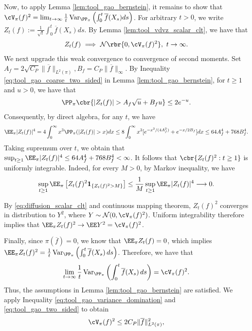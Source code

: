 \documentclass[11pt]{article}
\begin{document}
Now, to apply Lemma \ref{lem:tool_gao_bernstein}, it remains to show that $\cV_\pi(f)^2=\lim_{t\to\infty}
\frac1t
\operatorname{Var}_{\PP_\pi}
\left(
\int_0^t\overline f(X_s)ds
\right)$.
For arbitrary $t>0$, we write $Z_t(f)
:=
\frac1{\sqrt t}
\int_0^t\overline f(X_s)ds$. By Lemma \ref{lem:tool_vdvz_scalar_clt}, we have that
\begin{align}
Z_t(f)
\ \Longrightarrow\
\mathcal N\rbr{0,\cV_\pi(f)^2},
\ t\to\infty.
\label{eq:diffusion_scalar_clt}
\end{align}
We next upgrade this weak convergence to convergence of second moments.
Set
$A_f=
2\sqrt{C_P}\|\overline f\|_{L^2(\pi)},
B_f=
C_P\|\overline f\|_\infty$.
By Inequality \eqref{eq:tool_gao_coarse_two_sided} in Lemma \ref{lem:tool_gao_bernstein}, for $t\ge1$ and
$u>0$, we have that
\begin{align*}
\PP_\pi\cbr{
|Z_t(f)|>A_f\sqrt u+B_fu
}
\le2e^{-u}.
\end{align*}
Consequently, by direct algebra, for any $t$, we have
\begin{align*}
    \EE_\pi|Z_t(f)|^4=4\int_{0}^{\infty}x^3\PP_{\pi}(|Z_t(f)|>x)dx\le 8\int_{0}^{\infty}x^3[e^{-x^2/(4A_f^2)}+e^{-x/2B_f}]dx\le 64A_f^4+768B_f^4.
\end{align*}
Taking supremum over $t$, we obtain that
$\sup_{t\ge1}\EE_\pi|Z_t(f)|^4
\le
64A_f^4+768B_f^4
<\infty$. It follows that $\cbr{Z_t(f)^2:t\ge1}$ is uniformly integrable. Indeed,
for every $M>0$, by Markov inequality, we have
\begin{align*}
\sup_{t\ge1}
\EE_\pi\left[
Z_t(f)^2
\mathbf 1_{\{Z_t(f)^2>M\}}
\right]
\le
\frac1M
\sup_{t\ge1}\EE_\pi|Z_t(f)|^4
\longrightarrow0.
\end{align*}

By \eqref{eq:diffusion_scalar_clt} and continuous mapping theorem,
$Z_t(f)^2$ converges in distribution to $Y^2$, where
$Y\sim\mathcal N(0,\cV_\pi(f)^2)$. Uniform integrability therefore implies that $\EE_\pi Z_t(f)^2\rightarrow
\EE Y^2
=
\cV_\pi(f)^2$.

Finally, since $\pi(\overline f)=0$, we know that
$\EE_\pi Z_t(f)=0$, which implies $\EE_\pi Z_t(f)^2
=
\frac1t
\operatorname{Var}_{\PP_\pi}
\left(
\int_0^t\overline f(X_s)\,ds
\right)$. Therefore, we have that
\begin{align}
\lim_{t\to\infty}
\frac1t
\operatorname{Var}_{\PP_\pi}
\left(
\int_0^t\overline f(X_s)\,ds
\right)
=
\cV_\pi(f)^2.
\label{eq:diffusion_asymptotic_variance}
\end{align}
Thus, the assumptions in Lemma \ref{lem:tool_gao_bernstein} are satisfied. We apply Inequality \eqref{eq:tool_gao_variance_domination} and \eqref{eq:tool_gao_two_sided} to obtain
\begin{align}
\cV_\pi(f)^2
\le
2C_P\|\overline f\|_{L^2(\pi)}^2,
\label{eq:diffusion_variance_domination}
\end{align}
\end{document}
